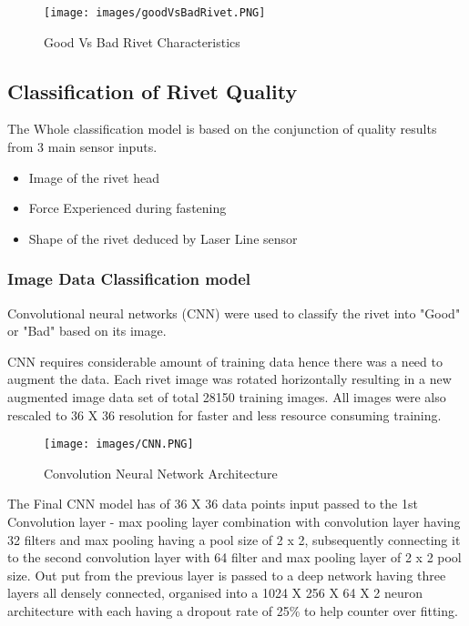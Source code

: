 \documentclass{article}
\begin{document}
\begin{figure}[H]
    \centering
    \texttt{[image: images/goodVsBadRivet.PNG]}
    \caption{Good Vs Bad Rivet Characteristics}
    \label{fig:goodVsBadRivet}
\end{figure}


\subsection{Classification of Rivet Quality}

The Whole classification model is based on the conjunction of quality results from 3 main sensor inputs.

\begin{itemize}
    \item Image of the rivet head
    \item Force Experienced during fastening
    \item Shape of the rivet deduced by Laser Line sensor
\end{itemize}


\subsubsection{Image Data Classification model}
Convolutional neural networks (CNN) \cite{Krizhevsky:2017:ICD:3098997.3065386} were used to classify the rivet into "Good" or "Bad" based on its image.


CNN requires considerable amount of training data hence there was a need to augment the data. Each rivet image was rotated horizontally resulting in a new augmented image data set of total 28150 training images. All images were also rescaled to 36 X 36 resolution for faster and less resource consuming training.

\begin{figure}[H]
    \centering
    \texttt{[image: images/CNN.PNG]}
    \caption{Convolution Neural Network Architecture}
    \label{fig:ConvolutionNeuralNetworkArchitecture}
\end{figure}

The Final CNN model has of 36 X 36 data points input passed to the 1st Convolution layer - max pooling layer combination with convolution layer having 32 filters and max pooling having a pool size of 2 x 2, subsequently connecting it to the second convolution layer with 64 filter and max pooling layer of 2 x 2 pool size. Out put from the previous layer is passed to a deep network having three layers all densely connected, organised into a 1024 X 256 X 64 X 2 neuron  architecture with each having a dropout rate of 25\% to help counter over fitting.\\
\end{document}
